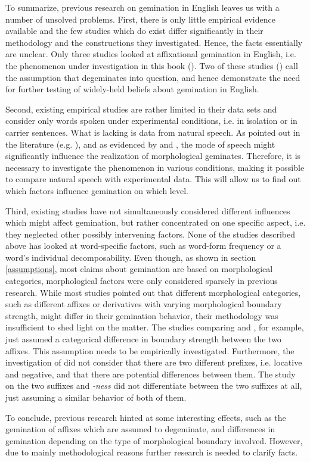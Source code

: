 To summarize, previous research on gemination in English leaves us with a number of unsolved problems. First, there is only little empirical evidence available and the few studies which do exist differ significantly in their methodology and the constructions they investigated. Hence, the facts essentially are unclear. Only three studies looked at affixational gemination in English, i.e. the phenomenon under investigation in this book (\citealt{Kaye.2005, Oh.2012, Kotzor.2016}). Two of these studies (\citealt{Kaye.2005, Oh.2012}) call the assumption that  degeminates into question, and hence demonstrate the need for further testing of widely-held beliefs about gemination in English. 

Second, existing empirical studies are rather limited in their data sets and consider only words spoken under experimental conditions, i.e. in isolation or in carrier sentences. What is lacking is data from natural speech. As pointed out in the literature (e.g. \citealt{Giegerich.1992, Bauer.2013}), and as evidenced by \cite{Oh.2012} and \cite{Oh.2013}, the mode of speech might significantly influence the realization of morphological geminates. Therefore, it is necessary to investigate the phenomenon in various conditions, making it possible to compare natural speech with experimental data. This will allow us to find out which factors influence gemination on which level.

Third, existing studies have not simultaneously considered different influences which might affect gemination, but rather concentrated on one specific aspect, i.e. they neglected other possibly intervening factors. None of the studies described above has looked at word-specific factors, such as word-form frequency or a word's individual decomposability. Even though, as shown in section \ref {assumptions}, most claims about gemination are based on morphological categories, morphological factors were only considered sparsely in previous research. While most studies pointed out that different morphological categories, such as different affixes or derivatives with varying morphological boundary strength, might differ in their gemination behavior, their methodology was insufficient to shed light on the matter. 
The studies comparing  and , for example, just assumed a categorical difference in boundary strength between the two affixes. This assumption needs to be empirically investigated. Furthermore, the investigation of  did not consider that there are two different prefixes, i.e. locative and negative, and that there are potential differences between them. The study on the two suffixes  and \textit{-ness} did not differentiate between the two suffixes at all, just assuming a similar behavior of both of them. 

To conclude, previous research hinted at some interesting effects, such as the gemination of affixes which are assumed to degeminate, and differences in gemination depending on the type of morphological boundary involved. However, due to mainly methodological reasons further research is needed to clarify facts.

